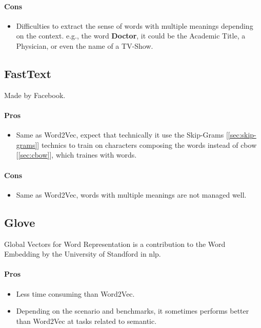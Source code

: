 \paragraph{Cons}
\begin{itemize}
    \setlength\itemsep{0em}
    \item Difficulties to extract the sense of words with multiple meanings depending on the context. e.g., the word \textbf{Doctor}, it could be the Academic Title, a Physician, or even the name of a TV-Show.
\end{itemize}

\subsection{FastText\cite{article:fasttext}}
Made by Facebook.
\paragraph{Pros}
\begin{itemize}
    \setlength\itemsep{0em}
    \item Same as Word2Vec, expect that technically it use the Skip-Grams [\ref{sec:skip-grams}] technics to train on characters composing the words instead of \gls{cbow} [\ref{sec:cbow}], which traines with words.
\end{itemize}
\paragraph{Cons}
\begin{itemize}
    \setlength\itemsep{0em}
    \item Same as Word2Vec, words with multiple meanings are not managed well.
\end{itemize}


\subsection{Glove\cite{article:glove}}
Global Vectors for Word Representation is a contribution to the Word Embedding by the University of Standford in \gls{nlp}.
\paragraph{Pros}
\begin{itemize}
    \setlength\itemsep{0em}
    \item Less time consuming than Word2Vec.
    \item Depending on the scenario and benchmarks, it sometimes performs better than Word2Vec at tasks related to semantic.
\end{itemize}
